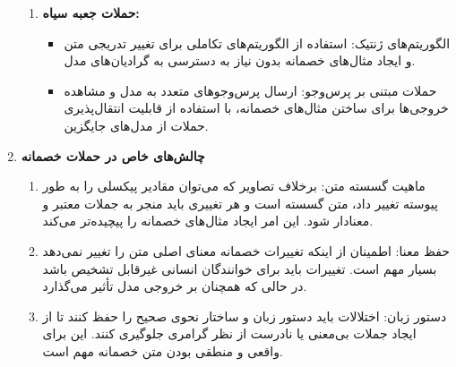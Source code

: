 \begin{qsolve}
\begin{enumerate}
\begin{enumerate}
		
		
		
		\item \textbf{حملات جعبه سیاه:}
		\begin{itemize}
			\item 
الگوریتم‌های ژنتیک: استفاده از الگوریتم‌های تکاملی برای تغییر تدریجی متن و ایجاد مثال‌های خصمانه بدون نیاز به دسترسی به گرادیان‌های مدل.

			\item 
حملات مبتنی بر پرس‌وجو: ارسال پرس‌وجوهای متعدد به مدل و مشاهده خروجی‌ها برای ساختن مثال‌های خصمانه، با استفاده از قابلیت انتقال‌پذیری حملات از مدل‌های جایگزین.
		\end{itemize}
	\end{enumerate}
	
	
	
	
	
	
	
	
	\item \textbf{چالش‌های خاص در حملات خصمانه }
	\begin{enumerate}
		\item 
ماهیت گسسته متن:
برخلاف تصاویر که می‌توان مقادیر پیکسلی را به طور پیوسته تغییر داد، متن گسسته است و هر تغییری باید منجر به جملات معتبر و معنادار شود. این امر ایجاد مثال‌های خصمانه را پیچیده‌تر می‌کند.


		\item 
حفظ معنا:
اطمینان از اینکه تغییرات خصمانه معنای اصلی متن را تغییر نمی‌دهد بسیار مهم است. تغییرات باید برای خوانندگان انسانی غیرقابل تشخیص باشد در حالی که همچنان بر خروجی مدل تأثیر می‌گذارد.

		\item 
دستور زبان:
اختلالات باید دستور زبان و ساختار نحوی صحیح را حفظ کنند تا از ایجاد جملات بی‌معنی یا نادرست از نظر گرامری جلوگیری کنند. این برای واقعی و منطقی بودن متن خصمانه مهم است.
	\end{enumerate}
\end{enumerate}
\end{qsolve}



